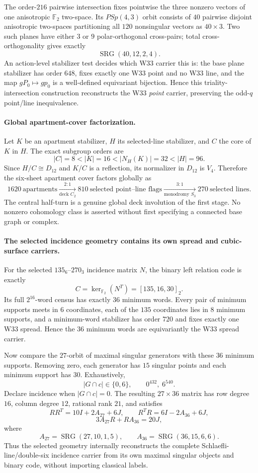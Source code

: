 The order-$216$ pairwise intersection fixes pointwise the three nonzero vectors
of one anisotropic $\mathbb F_2$ two-space.  Its $PSp(4,3)$ orbit consists of
$40$ pairwise disjoint anisotropic two-spaces partitioning all $120$
nonsingular vectors as $40\times3$.  Two such planes have either $3$ or $9$
polar-orthogonal cross-pairs; total cross-orthogonality gives exactly
\[
  \operatorname{SRG}(40,12,2,4).
\]
An action-level stabilizer test decides which W33 carrier this is: the base
plane stabilizer has order $648$, fixes exactly one W33 point and no W33 line,
and the map $gP_0\mapsto gp_0$ is a well-defined equivariant bijection.  Hence
this triality-intersection construction reconstructs the W33 \emph{point}
carrier, preserving the odd-$q$ point/line inequivalence.

\paragraph{Global apartment-cover factorization.}
Let $K$ be an apartment stabilizer, $H$ its selected-line stabilizer, and $C$
the core of $K$ in $H$.  The exact subgroup orders are
\[
  |C|=8<|K|=16<|N_H(K)|=32<|H|=96.
\]
Since $H/C\cong D_{12}$ and $K/C$ is a reflection, its normalizer in $D_{12}$
is $V_4$.  Therefore the six-sheet apartment cover factors globally as
\[
  1620\ \text{apartments}
  \xrightarrow[\text{deck }C_2]{2:1}
  810\ \text{selected point--line flags}
  \xrightarrow[\text{monodromy }S_3]{3:1}
  270\ \text{selected lines}.
\]
The central half-turn is a genuine global deck involution of the first stage.
No nonzero cohomology class is asserted without first specifying a connected
base graph or complex.

\paragraph{The selected incidence geometry contains its own spread and cubic-surface carriers.}
For the selected $135_6$--$270_3$ incidence matrix $N$, the binary left relation
code is exactly
\[
  C=\ker_{\mathbb F_2}(N^T)=[135,16,30]_2.
\]
Its full $2^{16}$-word census has exactly $36$ minimum words.  Every pair of
minimum supports meets in $6$ coordinates, each of the $135$ coordinates lies
in $8$ minimum supports, and a minimum-word stabilizer has order $720$ and fixes
exactly one W33 spread.  Hence the $36$ minimum words are equivariantly the W33
spread carrier.

Now compare the $27$-orbit of maximal singular generators with these $36$
minimum supports.  Removing zero, each generator has $15$ singular points and
each minimum support has $30$.  Exhaustively,
\[
  |G\cap c|\in\{0,6\},
  \qquad 0^{432},\;6^{540}.
\]
Declare incidence when $|G\cap c|=0$.  The resulting
$27\times36$ matrix has row degree $16$, column degree $12$, rational rank
$21$, and satisfies
\[
 RR^T=10I+2A_{27}+6J,
 \qquad
 R^TR=6I-2A_{36}+6J,
\]
\[
 3A_{27}R+RA_{36}=20J,
\]
where
\[
 A_{27}=\operatorname{SRG}(27,10,1,5),
 \qquad
 A_{36}=\operatorname{SRG}(36,15,6,6).
\]
Thus the selected geometry internally reconstructs the complete
Schlaefli-line/double-six incidence carrier from its own maximal singular
objects and binary code, without importing classical labels.

